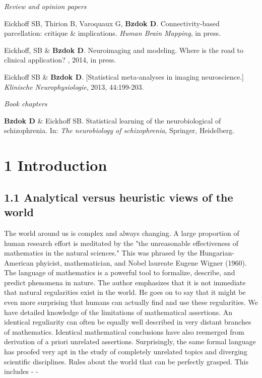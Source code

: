 \documentclass[authoryear,review,3p]{elsarticle}
\begin{document}
\bigskip
\textit{Review and opinion papers}

Eickhoff SB, Thirion B, Varoquaux G, \textbf{Bzdok D}.
Connectivity-based parcellation: critique \& implications.
\textit{Human Brain Mapping}, in press.

Eickhoff, SB \& \textbf{Bzdok D}.
Neuroimaging and modeling. Where is the road to clinical application?
, 2014, in press. 

Eickhoff SB \& \textbf{Bzdok D}.
[Statistical meta-analyses in imaging neuroscience.]
\textit{Klinische Neurophysiologie}, 2013, 44:199-203.

\bigskip
\textit{Book chapters}

\linebreak
\textbf{Bzdok D} \& Eickhoff SB.
Statistical learning of the neurobiological of schizophrenia.
In: \textit{The neurobiology of schizophrenia}, Springer, Heidelberg.

\newpage

\section*{1 Introduction}

\subsection*{1.1 Analytical versus heuristic views of the world}

The world around us is complex and always changing.
%
A large proportion of human research effort is meditated by the 
"the unreasonable effectiveness of mathematics in the natural sciences."
This was phrased by the Hungarian-American
phyicist, mathematician, and Nobel laureate Eugene Wigner (1960).
The language of mathematics is a powerful tool to
formalize, describe, and predict phenomena in nature.
The author emphasizes that it is not immediate that
natural regularities exist in the world. He goes on to
say that it might be even more surprising that humans can actually
find and use these regularities.
We have detailed knowledge of the limitations of mathematical
assertions.
%
An identical reguliarity can often be equally well described in very distant
branches of mathematics.
%
Identical mathematical conclusions have also reemerged from derivation of
a priori unrelated assertions.
%
Surprisingly, the same formal language has proofed very apt in
the study of completely unrelated topics and diverging scientific disciplines.
%
Rules about the world that can be perfectly grasped.
This includes
- 
-
\end{document}
